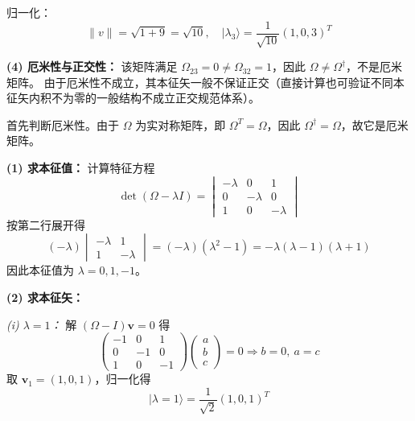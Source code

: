 \begin{solution}[矩阵本征值与本征矢]
归一化：
\[
\|v\|=\sqrt{1+9}=\sqrt{10},\quad
|\lambda_3\rangle=\frac{1}{\sqrt{10}}(1,0,3)^T
\]

\vspace{0.5em}
\textbf{(4) 厄米性与正交性：}
该矩阵满足 $\Omega_{23}=0\neq \Omega_{32}=1$，因此 $\Omega\neq \Omega^\dagger$，不是厄米矩阵。
由于厄米性不成立，其本征矢一般不保证正交（直接计算也可验证不同本征矢内积不为零的一般结构不成立正交规范体系）。

\end{solution}

\begin{solution}[考虑矩阵的本征值与对角化]
\answer
首先判断厄米性。由于 $\Omega$ 为实对称矩阵，即 $\Omega^T=\Omega$，因此 $\Omega^\dagger=\Omega$，故它是厄米矩阵。

\vspace{0.3em}
\textbf{(1) 求本征值：}
计算特征方程
\[
\det(\Omega-\lambda I)=
\begin{vmatrix}
-\lambda & 0 & 1\\
0 & -\lambda & 0\\
1 & 0 & -\lambda
\end{vmatrix}
\]
按第二行展开得
\[
(-\lambda)\begin{vmatrix}
-\lambda & 1\\
1 & -\lambda
\end{vmatrix}
= (-\lambda)(\lambda^2-1)= -\lambda(\lambda-1)(\lambda+1)
\]
因此本征值为 $\lambda=0,1,-1$。

\vspace{0.3em}
\textbf{(2) 求本征矢：}

\emph{(i) $\lambda=1$：}
解 $(\Omega-I)\mathbf{v}=0$ 得
\[
\begin{pmatrix}
-1&0&1\\
0&-1&0\\
1&0&-1
\end{pmatrix}
\begin{pmatrix}a\\b\\c\end{pmatrix}=0
\Rightarrow b=0,\ a=c
\]
取 $\mathbf{v}_1=(1,0,1)$，归一化得
\[
|\lambda=1\rangle=\frac{1}{\sqrt{2}}(1,0,1)^T
\]


\end{solution}
